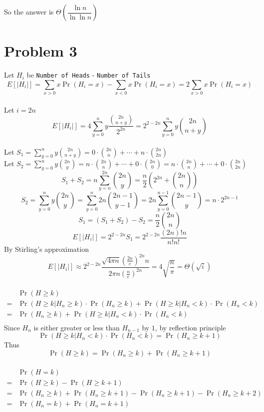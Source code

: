 \documentclass[12pt]{article}
\begin{document}
So the answer is $\Theta\left(\dfrac{\ln n}{\ln\ln n}\right)$
\section*{Problem 3}
Let $H_i$ be \texttt{Number of Heads} - \texttt{Number of Tails}\\
$$E[|H_i|]=\sum_{x>0}x\Pr(H_i=x)-\sum_{x<0}x\Pr(H_i=x)=2\sum_{x>0}x\Pr(H_i=x)$$\\
Let $i=2n$\\
$$E[|H_i|]=4\sum_{y=0}^n y\dfrac{\binom{2n}{n+y}}{2^{2n}}=2^{2-2n}\sum_{y=0}^n y\binom{2n}{n+y}$$\\
Let $S_1=\sum_{y=0}^n y\binom{2n}{n+y}=0\cdot\binom{2n}{n}+\cdots+n\cdot\binom{2n}{2n}$\\
Let $S_2=\sum_{y=0}^{n} y\binom{2n}{y}=n\cdot\binom{2n}{n}+\cdots+0\cdot\binom{2n}{0}=n\cdot\binom{2n}{n}+\cdots+0\cdot\binom{2n}{2n}$\\
$$S_1+S_2=n\sum_{y=n}^{2n}\binom{2n}{y}=\frac{n}{2}\left(2^{2n}+\binom{2n}{n}\right)$$
$$S_2=\sum_{y=0}^{n} y\binom{2n}{y}=\sum_{y=0}^n 2n\binom{2n-1}{y-1}=2n\sum_{y=0}^{n-1} \binom{2n-1}{y}=n\cdot2^{2n-1}$$
$$S_1=(S_1+S_2)-S_2=\frac{n}{2}\binom{2n}{n}$$
$$E[|H_i|]=2^{2-2n}S_1=2^{2-2n}\frac{(2n)!n}{n!n!}$$
By Stirling's approximation
$$E[|H_i|]\approx2^{2-2n}\frac{\sqrt{4\pi n}\left(\frac{2n}{e}\right)^{2n}n}{2\pi n\left(\frac{n}{e}\right)^{2n}}=4\sqrt{\frac{n}{\pi}}=\Theta(\sqrt{i})$$\\
\begin{align*}
&\Pr(H\geq k)\\
=&\Pr(H\geq k|H_n\geq k)\cdot\Pr(H_n\geq k)+\Pr(H\geq k|H_n<k)\cdot\Pr(H_n<k)\\
=&\Pr(H_n\geq k)+\Pr(H\geq k|H_n<k)\cdot\Pr(H_n<k)\\
\end{align*}
Since $H_n$ is either greater or less than $H_{n-1}$ by $1$, by reflection principle\\
$$\Pr(H\geq k|H_n<k)\cdot\Pr(H_n<k)=\Pr(H_n\geq k+1)$$
Thus
$$\Pr(H\geq k)=\Pr(H_n\geq k)+\Pr(H_n\geq k+1)$$\\

\begin{align*}
&\Pr(H=k)\\
=&\Pr(H\geq k)-\Pr(H\geq k+1)\\
=&\Pr(H_n\geq k)+\Pr(H_n\geq k+1)-\Pr(H_n\geq k+1)-\Pr(H_n\geq k+2)\\
=&\Pr(H_n=k)+\Pr(H_n=k+1)
\end{align*}
\end{document}
